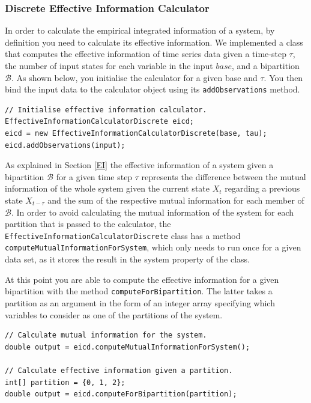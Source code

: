 \documentclass[a4paper,11pt]{article}
\begin{document}
\subsubsection{Discrete Effective Information Calculator}
\label{sec:impl:ei}

In order to calculate the empirical integrated information of a system, by definition you need to calculate its effective information. We implemented a class that computes the effective information of time series data given a time-step $\tau$, the number of input states for each variable in the input $base$, and a bipartition $\mathcal{B}$. As shown below, you initialise the calculator for a given base and $\tau$. You then bind the input data to the calculator object using its \texttt{addObservations} method.

\begin{verbatim}
// Initialise effective information calculator.
EffectiveInformationCalculatorDiscrete eicd;
eicd = new EffectiveInformationCalculatorDiscrete(base, tau);
eicd.addObservations(input);
\end{verbatim}

As explained in Section \ref{EI} the effective information of a system given a bipartition $\mathcal{B}$ for a given time step $\tau$ represents the difference between the mutual information of the whole system given the current state $X_t$ regarding a previous state $X_{t-\tau}$ and the sum of the respective mutual information for each member of $\mathcal{B}$. In order to avoid calculating the mutual information of the system for each partition that is passed to the calculator, the \texttt{EffectiveInformationCalculatorDiscrete} class has a method \texttt{computeMutualInformationForSystem}, which only needs to run once for a given data set, as it stores the result in the system property of the class.

At this point you are able to compute the effective information for a given bipartition with the method \texttt{computeForBipartition}. The latter takes a partition as an argument in the form of an integer array specifying which variables to consider as one of the partitions of the system.

\begin{verbatim}
// Calculate mutual information for the system.
double output = eicd.computeMutualInformationForSystem();

// Calculate effective information given a partition.
int[] partition = {0, 1, 2};
double output = eicd.computeForBipartition(partition);
\end{verbatim}
\end{document}
